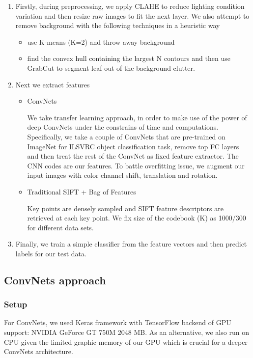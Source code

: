 \documentclass[journal, 10pt]{IEEEtran}
\begin{document}
\begin{enumerate}
  \item Firstly, during preprocessing, we apply CLAHE\cite{CLAHE} to reduce lighting condition variation and then resize raw images to fit the next layer. We also attempt to remove background with the following techniques in a heuristic way
  \begin{itemize}
    \item use K-means (K=2) and throw away background
    \item find the convex hull containing the largest N contours and then use GrabCut\cite{Grabcut} to segment leaf out of the background clutter.
  \end{itemize}
\item Next we extract features
\begin{itemize}
  \item ConvNets

    We take transfer learning approach, in order to make use of the power of deep ConvNets under the constrains of time and computations. Specifically, we take a couple of ConvNets that are pre-trained on ImageNet for ILSVRC object classification task, remove top FC layers and then treat the rest of the ConvNet as fixed feature extractor. The CNN codes are our features. To battle overfitting issue, we augment our input images with color channel shift, translation and rotation.
  \item Traditional SIFT + Bag of Features

    Key points are densely sampled and SIFT feature descriptors are retrieved at each key point. We fix size of the codebook (K) as 1000/300 for different data sets.
\end{itemize}
\item Finally,  we train a simple classifier from the feature vectors and then predict labels for our test data.
\end{enumerate}
\subsection{ConvNets approach}
  \subsubsection{Setup}
  For ConvNets, we used Keras framework \cite{Keras} with TensorFlow \cite{TensorFlow} backend of GPU support: NVIDIA GeForce GT 750M 2048 MB. As an alternative, we also run on CPU given the limited graphic memory of our GPU which is crucial for a deeper ConvNets architecture.
\end{document}
